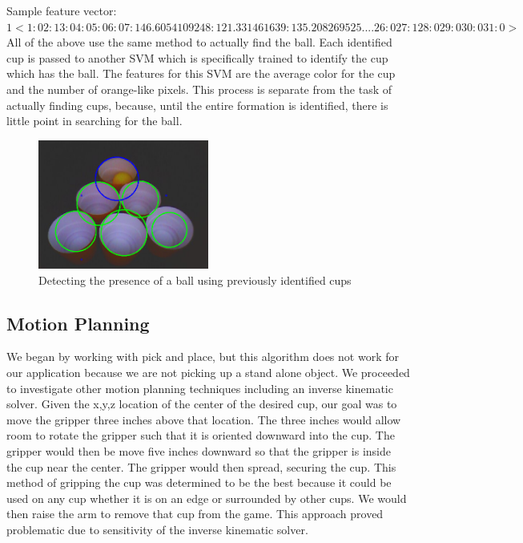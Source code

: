 \documentclass[letterpaper, 10 pt, conference]{ieeeconf}  %
\begin{document}
Sample feature vector:\\

$1  <1:0 2:1 3:0 4:0 5:0 6:0 7:146.605410924 8:121.33146163 9:135.208269525 .... 26:0 27:1 28:0 29:0 30:0 31:0>$ \\


All of the above use the same method to actually find the ball.  Each identified cup is passed to another SVM which is specifically trained to identify the cup which has the ball.  The features for this SVM are the average color for the cup and the number of orange-like pixels.  This process is separate from the task of actually finding cups, because, until the entire formation is identified, there is little point in searching for the ball.

\begin{figure}[thpb]
      \centering
	  \includegraphics[width = 0.5\textwidth]{ball_detected_6}
      \caption{Detecting the presence of a ball using previously identified cups}
      \label{fig:ball_detected}
\end{figure}

\subsection{Motion Planning}

We began by working with pick and place, but this algorithm does not work for our application because we are not picking up a stand alone object. We proceeded to investigate other motion planning techniques including an inverse kinematic solver. Given the x,y,z location of the center of the desired cup, our goal was to move the gripper three inches above that location. The three inches would allow room to rotate the gripper such that it is oriented downward into the cup. The gripper would then be move five inches downward so that the gripper is inside the cup near the center. The gripper would then spread, securing the cup. This method of gripping the cup was determined to be the best because it could be used on any cup whether it is on an edge or surrounded by other cups. We would then raise the arm to remove that cup from the game.  This approach proved problematic due to sensitivity of the inverse kinematic solver. 
\end{document}
